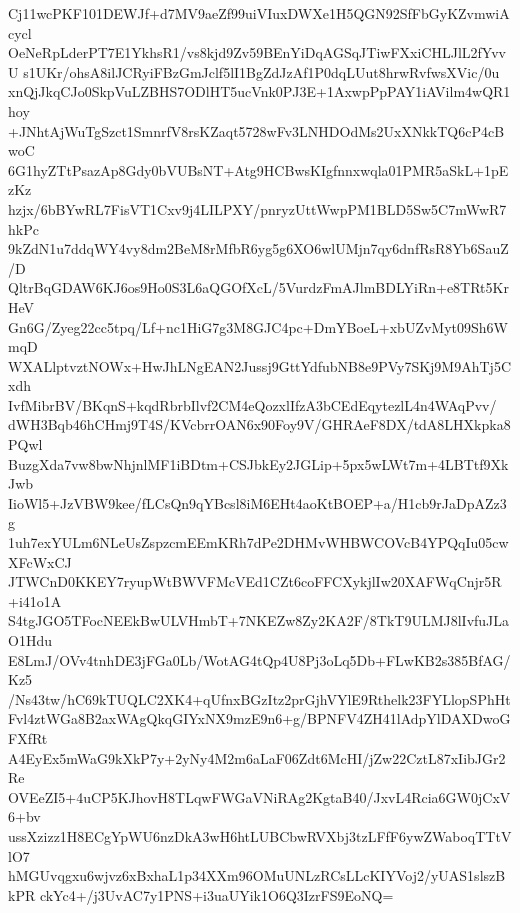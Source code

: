 Cj11wcPKF101DEWJf+d7MV9aeZf99uiVIuxDWXe1H5QGN92SfFbGyKZvmwiAcycl
OeNeRpLderPT7E1YkhsR1/vs8kjd9Zv59BEnYiDqAGSqJTiwFXxiCHLJlL2fYvvU
s1UKr/ohsA8ilJCRyiFBzGmJclf5lI1BgZdJzAf1P0dqLUut8hrwRvfwsXVic/0u
xnQjJkqCJo0SkpVuLZBHS7ODlHT5ucVnk0PJ3E+1AxwpPpPAY1iAVilm4wQR1hoy
+JNhtAjWuTgSzct1SmnrfV8rsKZaqt5728wFv3LNHDOdMs2UxXNkkTQ6cP4cBwoC
6G1hyZTtPsazAp8Gdy0bVUBsNT+Atg9HCBwsKIgfnnxwqla01PMR5aSkL+1pEzKz
hzjx/6bBYwRL7FisVT1Cxv9j4LILPXY/pnryzUttWwpPM1BLD5Sw5C7mWwR7hkPc
9kZdN1u7ddqWY4vy8dm2BeM8rMfbR6yg5g6XO6wlUMjn7qy6dnfRsR8Yb6SauZ/D
QltrBqGDAW6KJ6os9Ho0S3L6aQGOfXcL/5VurdzFmAJlmBDLYiRn+e8TRt5KrHeV
Gn6G/Zyeg22cc5tpq/Lf+nc1HiG7g3M8GJC4pc+DmYBoeL+xbUZvMyt09Sh6WmqD
WXALlptvztNOWx+HwJhLNgEAN2Jussj9GttYdfubNB8e9PVy7SKj9M9AhTj5Cxdh
IvfMibrBV/BKqnS+kqdRbrbIlvf2CM4eQozxlIfzA3bCEdEqytezlL4n4WAqPvv/
dWH3Bqb46hCHmj9T4S/KVcbrrOAN6x90Foy9V/GHRAeF8DX/tdA8LHXkpka8PQwl
BuzgXda7vw8bwNhjnlMF1iBDtm+CSJbkEy2JGLip+5px5wLWt7m+4LBTtf9XkJwb
IioWl5+JzVBW9kee/fLCsQn9qYBcsl8iM6EHt4aoKtBOEP+a/H1cb9rJaDpAZz3g
1uh7exYULm6NLeUsZspzcmEEmKRh7dPe2DHMvWHBWCOVcB4YPQqIu05cwXFcWxCJ
JTWCnD0KKEY7ryupWtBWVFMcVEd1CZt6coFFCXykjlIw20XAFWqCnjr5R+i41o1A
S4tgJGO5TFocNEEkBwULVHmbT+7NKEZw8Zy2KA2F/8TkT9ULMJ8lIvfuJLaO1Hdu
E8LmJ/OVv4tnhDE3jFGa0Lb/WotAG4tQp4U8Pj3oLq5Db+FLwKB2s385BfAG/Kz5
/Ns43tw/hC69kTUQLC2XK4+qUfnxBGzItz2prGjhVYlE9Rthelk23FYLlopSPhHt
Fvl4ztWGa8B2axWAgQkqGIYxNX9mzE9n6+g/BPNFV4ZH41lAdpYlDAXDwoGFXfRt
A4EyEx5mWaG9kXkP7y+2yNy4M2m6aLaF06Zdt6McHI/jZw22CztL87xIibJGr2Re
OVEeZI5+4uCP5KJhovH8TLqwFWGaVNiRAg2KgtaB40/JxvL4Rcia6GW0jCxV6+bv
ussXzizz1H8ECgYpWU6nzDkA3wH6htLUBCbwRVXbj3tzLFfF6ywZWaboqTTtVlO7
hMGUvqgxu6wjvz6xBxhaL1p34XXm96OMuUNLzRCsLLcKIYVoj2/yUAS1slszBkPR
ckYc4+/j3UvAC7y1PNS+i3uaUYik1O6Q3IzrFS9EoNQ=
